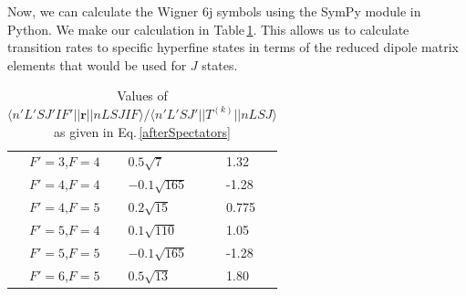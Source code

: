Now, we can calculate the Wigner 6j symbols using the SymPy module in Python\cite{sympy}\cite{rasch6j}.
We make our calculation in Table\,\ref{coefficient_calculated}. %
This allows us to calculate transition rates to specific hyperfine states in terms of the reduced dipole matrix elements that would be used for $J$ states.

\begin{table}[h!]
\centering
\begin{tabular}{|c|l|l|}
\hline
$F'=3$,$F=4$&$0.5 \sqrt{7}$&1.32\\ 
$F'=4$,$F=4$&$- 0.1 \sqrt{165}$&-1.28\\ 
$F'=4$,$F=5$&$0.2 \sqrt{15}$&0.775\\ 
$F'=5$,$F=4$&$0.1 \sqrt{110}$&1.05\\ 
$F'=5$,$F=5$&$- 0.1 \sqrt{165}$&-1.28\\ 
$F'=6$,$F=5$&$0.5 \sqrt{13}$&1.80\\ 
\hline
\end{tabular}
\caption{Values of $\langle n' L' S J' I F' ||\mathbf{r}||n L S J I F\rangle / \langle n'L' S J'||T^{(k)}|| n L S J\rangle$ as given in Eq.\,\ref{afterSpectators}
\label{coefficient_calculated}}
\end{table}


